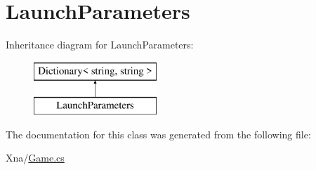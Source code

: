 \hypertarget{classMicrosoft_1_1Xna_1_1Framework_1_1LaunchParameters}{}\section{Launch\+Parameters}
\label{classMicrosoft_1_1Xna_1_1Framework_1_1LaunchParameters}
Inheritance diagram for Launch\+Parameters\+:\begin{figure}[H]
\begin{center}
\leavevmode
\includegraphics[height=2.000000cm]{classMicrosoft_1_1Xna_1_1Framework_1_1LaunchParameters}
\end{center}
\end{figure}


The documentation for this class was generated from the following file\+:\begin{DoxyCompactItemize}
\item 
Xna/\hyperlink{Game_8cs}{Game.\+cs}\end{DoxyCompactItemize}
